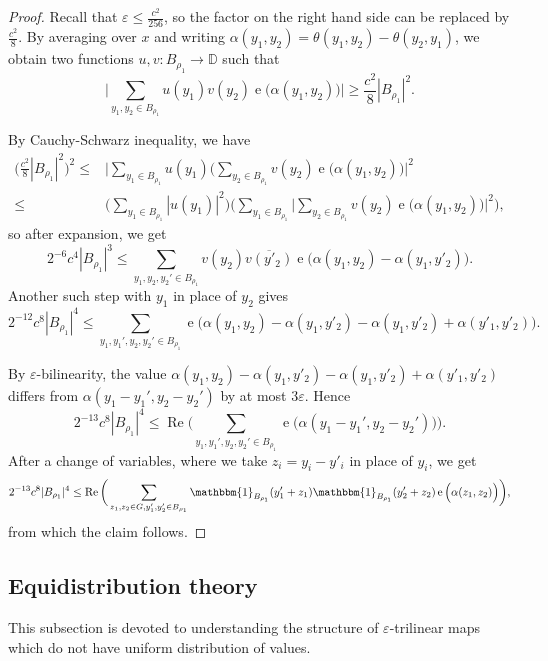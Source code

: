 \documentclass[a4paper,11pt]{article}
\numberwithin{theorem}{section}
\theoremstyle{definition}
\newcommand\id{\mathbbm{1}}
\newcommand{\on}[1]{
	\operatorname{#1}
}
\begin{document}
\begin{proof}
    Recall that $\varepsilon \leq \frac{c^2}{256}$, so the factor on the right hand side can be replaced by $\frac{c^2}{8}$. By averaging over $x$ and writing $\alpha(y_1, y_2) = \theta(y_1, y_2) - \theta(y_2, y_1)$, we obtain two functions $u,v : B_{\rho_1} \to \mathbb{D}$ such that
    \[\Big|\sum_{y_1, y_2 \in B_{\rho_1}}  u(y_1) v(y_2) \on{e}\Big(\alpha(y_1, y_2)\Big)\Big|\geq \frac{c^2}{8}|B_{\rho_1}|^2.\]

    By Cauchy-Schwarz inequality, we have
    \begin{align*}\Big(\frac{c^2}{8}|B_{\rho_1}|^2\Big)^2 \leq &\Big|\sum_{y_1\in B_{\rho_1}}  u(y_1) \Big(\sum_{y_2 \in B_{\rho_1}} v(y_2) \on{e}\Big(\alpha(y_1, y_2)\Big)\Big|^2\\
    \leq& \Big(\sum_{y_1\in B_{\rho_1}}  |u(y_1)|^2\Big) \Big(\sum_{y_1\in B_{\rho_1}}  \Big|\sum_{y_2 \in B_{\rho_1}} v(y_2) \on{e}\Big(\alpha(y_1, y_2)\Big)\Big|^2\Big),\end{align*}
    so after expansion, we get
    \[2^{-6}c^4|B_{\rho_1}|^3 \leq \sum_{y_1, y_2, y_2' \in B_{\rho_1}} v(y_2) \overline{v(y'_2)}\on{e}\Big(\alpha(y_1, y_2) - \alpha(y_1, y'_2)\Big).\]
    Another such step with $y_1$ in place of $y_2$ gives
    \[2^{-12}c^8|B_{\rho_1}|^4 \leq \sum_{y_1, y_1', y_2, y_2' \in B_{\rho_1}}\on{e}\Big(\alpha(y_1, y_2) - \alpha(y_1, y'_2) - \alpha(y_1, y'_2) + \alpha(y'_1, y'_2)\Big).\]

    By $\varepsilon$-bilinearity, the value $\alpha(y_1, y_2) - \alpha(y_1, y'_2) - \alpha(y_1, y'_2) + \alpha(y'_1, y'_2)$ differs from $\alpha(y_1 - y_1', y_2 - y_2')$ by at most $3\varepsilon$. Hence
   \[2^{-13}c^8|B_{\rho_1}|^4 \leq \on{Re}\bigg(\sum_{y_1, y_1', y_2, y_2' \in B_{\rho_1}}\on{e}\Big(\alpha(y_1 - y_1', y_2 - y_2')\Big)\bigg).\]
    After a change of variables, where we take $z_i = y_i - y'_i$ in place of $y_i$, we get
    \[2^{-13}c^8|B_{\rho_1}|^4 \leq \on{Re}\bigg(\sum_{z_1, z_2 \in G, y_1', y_2' \in B_{\rho_1}} \id_{B_{\rho_1}} (y'_1 + z_1)\id_{B_{\rho_1}} (y'_2+ z_2)\on{e}\Big(\alpha(z_1, z_2)\Big)\bigg),\]
    from which the claim follows.
\end{proof}

\subsection{Equidistribution theory}

This subsection is devoted to understanding the structure of $\varepsilon$-trilinear maps which do not have uniform distribution of values.
\end{document}
